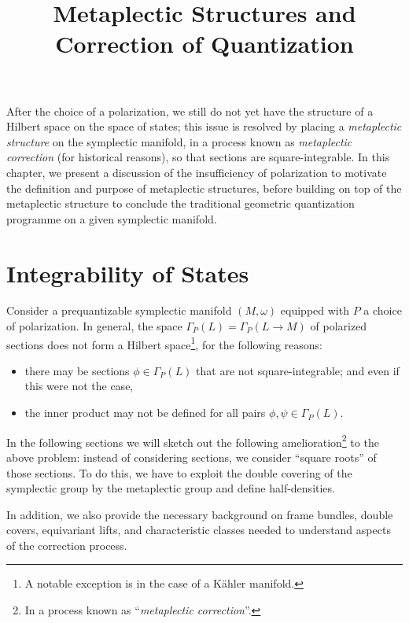 \documentclass{tufte-handout}
\title{Metaplectic Structures and Correction of Quantization}
\date{}
\begin{document}
\maketitle

After the choice of a polarization, we still do not yet have the structure of a Hilbert space on the space of states; this issue is resolved by placing a \emph{metaplectic structure} on the symplectic manifold, in a process known as \emph{metaplectic correction} (for historical reasons), so that sections are square-integrable. In this chapter, we present a discussion of the insufficiency of polarization to motivate the definition and purpose of metaplectic structures, before building on top of the metaplectic structure to conclude the traditional geometric quantization programme on a given symplectic manifold.

\section{Integrability of States}
Consider a prequantizable symplectic manifold $(M,\omega)$ equipped with $P$ a choice of polarization. In general, the space $\Gamma_P (L) = \Gamma_P(L \to M)$ of polarized sections does not form a Hilbert space\footnote{A notable exception is in the case of a K\"{a}hler manifold.}, for the following reasons:
\begin{itemize}
\item there may be sections $\phi \in \Gamma_P(L)$ that are not square-integrable; and even if this were not the case,

\item the inner product may not be defined for all pairs $\phi,\psi \in \Gamma_P(L)$.
\end{itemize}
In the following sections we will sketch out the following amelioration\footnote{In a process known as ``\emph{metaplectic correction}''.} to the above problem: instead of considering sections, we consider ``square roots'' of those sections. To do this, we have to exploit the double covering of the symplectic group by the metaplectic group and define half-densities.

In addition, we also provide the necessary background on frame bundles, double covers, equivariant lifts, and characteristic classes needed to understand aspects of the correction process.

\end{document}
